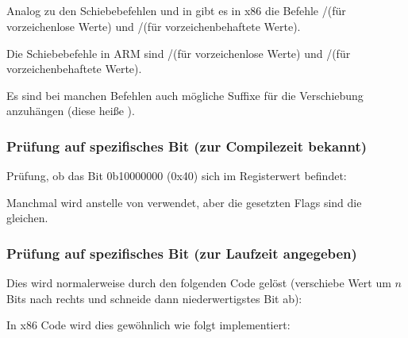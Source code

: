 \subsection{\Conclusion{}}

Analog zu den Schiebebefehlen \TT{$\ll$} und \TT{$\gg$} in \CCpp gibt es in
x86 die Befehle \SHR/\SHL (für vorzeichenlose Werte) und \SAR/\SHL (für
vorzeichenbehaftete Werte).

Die Schiebebefehle in ARM sind \LSR/\LSL (für vorzeichenlose Werte) und
\ASR/\LSL (für vorzeichenbehaftete Werte).

Es sind bei manchen Befehlen auch mögliche Suffixe für die Verschiebung
anzuhängen (diese heiße ).

\subsubsection{Prüfung auf spezifisches Bit (zur Compilezeit bekannt)}
Prüfung, ob das Bit 0b10000000 (0x40) sich im Registerwert befindet:









Manchmal wird \AND anstelle von \TEST verwendet, aber die gesetzten Flags sind
die gleichen.

\subsubsection{Prüfung auf spezifisches Bit (zur Laufzeit angegeben)}
Dies wird normalerweise durch den folgenden \CCpp Code gelöst (verschiebe Wert
um $n$ Bits nach rechts und schneide dann niederwertigstes Bit ab):


In x86 Code wird dies gewöhnlich wie folgt implementiert:

